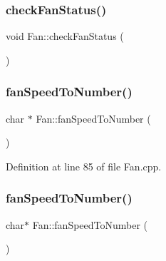 \subsubsection{\texorpdfstring{check\+Fan\+Status()}{checkFanStatus()}\hspace{0.1cm}{\footnotesize\ttfamily [2/2]}}
{\footnotesize\ttfamily void Fan\+::check\+Fan\+Status (\begin{DoxyParamCaption}{ }\end{DoxyParamCaption})\hspace{0.3cm}{\ttfamily [protected]}}

\mbox{\label{class_fan_acd41482f79dd009bcecd7740f8dbf002}} 
\subsubsection{\texorpdfstring{fan\+Speed\+To\+Number()}{fanSpeedToNumber()}\hspace{0.1cm}{\footnotesize\ttfamily [1/2]}}
{\footnotesize\ttfamily char $\ast$ Fan\+::fan\+Speed\+To\+Number (\begin{DoxyParamCaption}{ }\end{DoxyParamCaption})}



Definition at line 85 of file Fan.\+cpp.

\mbox{\label{class_fan_a02c3e5b711ec48e5790985c38998e841}} 
\subsubsection{\texorpdfstring{fan\+Speed\+To\+Number()}{fanSpeedToNumber()}\hspace{0.1cm}{\footnotesize\ttfamily [2/2]}}
{\footnotesize\ttfamily char$\ast$ Fan\+::fan\+Speed\+To\+Number (\begin{DoxyParamCaption}{ }\end{DoxyParamCaption})}

\mbox{\label{class_fan_a492f2551cf8f05d4ce64911807269764}} 
